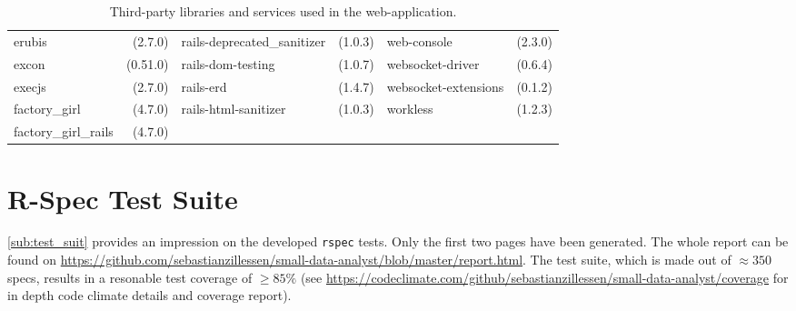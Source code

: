 \begin{table}[!h]
\begin{tabular}{|p{2.4cm}r||p{2.4cm}r||p{2.4cm}r|}
erubis&(2.7.0)&\tiny{rails-deprecated\_sanitizer}&(1.0.3)&web-console&(2.3.0)\\
excon&(0.51.0)&\tiny{rails-dom-testing}&(1.0.7)&\tiny{websocket-driver}&(0.6.4)\\
execjs&(2.7.0)&rails-erd&(1.4.7)&\tiny{websocket-extensions}&(0.1.2)\\
factory\_girl&(4.7.0)&\tiny{rails-html-sanitizer}&(1.0.3)&workless&(1.2.3)\\
factory\_girl\_rails&(4.7.0)&&&&\\
	\hline
	\end{tabular}
	\caption{Third-party libraries and services used in the web-application.}
	\label{tab:libs}
\end{table}

\clearpage
\newpage

\section{R-Spec Test Suite}
\label{app:d}
\label{app:rspec}
\sloppy
\autoref{sub:test_suit} provides an impression on the developed \texttt{rspec} tests. Only the first two pages have been generated. The whole report can be found on \href{https://github.com/sebastianzillessen/small-data-analyst/blob/master/report.html}{https://github.com/sebastianzillessen/small-data-analyst/blob/master/report.html}. The test suite, which is made out of $\approx 350$ specs, results in a resonable test coverage of $\geq 85\%$ (see \href{https://codeclimate.com/github/sebastianzillessen/small-data-analyst/coverage}{https://codeclimate.com/github/sebastianzillessen/small-data-analyst/coverage} for in depth code climate details and coverage report).
